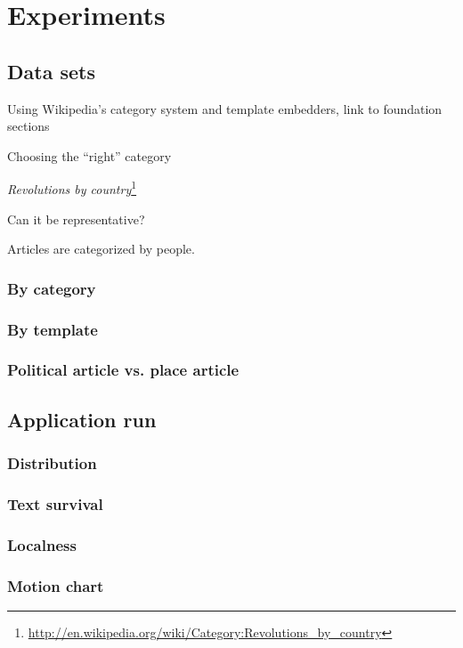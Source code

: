 \chapter{Experiments}\label{ch:experiment}

\section{Data sets}

\begin{todos}
	\item Using Wikipedia's category system and template embedders, link to foundation sections
    \item Choosing the ``right'' category 
    \item \emph{Revolutions by country}\footnote{\url{http://en.wikipedia.org/wiki/Category:Revolutions_by_country}}
    \item Can it be representative?
    \item Articles are categorized by people.
\end{todos}

\subsection{By category}

\subsection{By template}

\subsection{Political article vs. place article}



\section{Application run}


\subsection{Distribution}

\subsection{Text survival}

\subsection{Localness}

\subsection{Motion chart}
